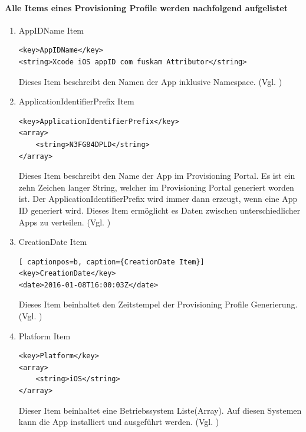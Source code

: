\paragraph{Alle Items eines Provisioning Profile werden nachfolgend aufgelistet}
\begin{enumerate}
    \item AppIDName Item

\begin{lstlisting}[captionpos=b, caption={AppIDName Item}]
<key>AppIDName</key>
<string>Xcode iOS appID com fuskam Attributor</string>
\end{lstlisting}
Dieses Item beschreibt den Namen der App inklusive Namespace. (Vgl. \cite{iOSSec[5], Hacking[1]})

    \item ApplicationIdentifierPrefix Item
\begin{lstlisting}[captionpos=b, caption={ApplicationIdentifierPrefix Item}]
<key>ApplicationIdentifierPrefix</key>
<array>
    <string>N3FG84DPLD</string>
</array>
\end{lstlisting}
Dieses Item beschreibt den Name der App im Provisioning Portal. Es ist ein zehn Zeichen langer String, welcher im Provisioning Portal generiert worden ist. Der ApplicationIdentifierPrefix wird immer dann erzeugt, wenn eine App ID generiert wird. Dieses Item ermöglicht es Daten zwischen unterschiedlicher Apps zu verteilen. (Vgl. \cite{iOSSec[5], Hacking[1]})

    \item CreationDate Item
\begin{lstlisting}[ captionpos=b, caption={CreationDate Item}]        
<key>CreationDate</key>
<date>2016-01-08T16:00:03Z</date>
\end{lstlisting}
Dieses Item beinhaltet den Zeitstempel der Provisioning Profile Generierung. (Vgl. \cite{iOSSec[5], Hacking[1]})

    \item Platform Item
\begin{lstlisting}[captionpos=b, caption={Platform Item}]        
<key>Platform</key>
<array>
    <string>iOS</string>
</array>
\end{lstlisting}
Dieser Item beinhaltet eine Betriebssystem Liste(Array). Auf diesen Systemen kann die App installiert und ausgeführt werden. (Vgl. \cite{iOSSec[5], Hacking[1]})


\end{enumerate}
